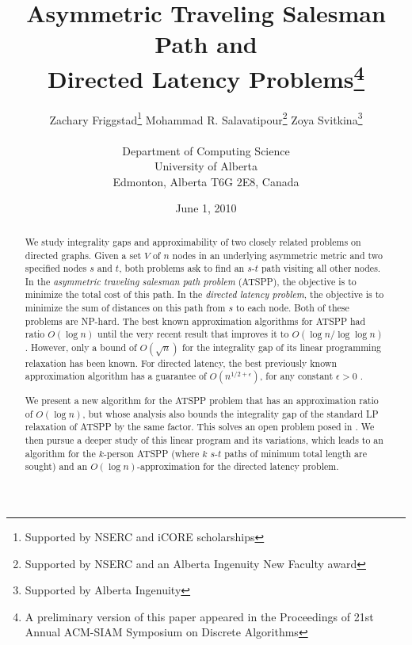 \documentclass[11pt]{article}
\begin{document}
\title{\Large Asymmetric Traveling Salesman Path and\\ Directed Latency Problems\footnote{A preliminary 
version of this paper appeared in the Proceedings of 21st Annual ACM-SIAM Symposium on 
Discrete Algorithms}}
\author{
Zachary Friggstad\thanks{Supported by NSERC and iCORE scholarships} \hspace{12mm}
Mohammad R. Salavatipour\thanks{Supported by NSERC and an Alberta Ingenuity New Faculty award} \hspace{12mm}
Zoya Svitkina\thanks{Supported by Alberta Ingenuity}\\
\\
\small{Department of Computing Science}\\ 
\small{University of Alberta}\\
\small{Edmonton, Alberta T6G 2E8, Canada}
}

\date{June 1, 2010}
\maketitle


\begin{abstract} 

We study integrality gaps and approximability of two closely related problems on directed graphs. 
Given a set $V$ of $n$ nodes in an underlying asymmetric metric and two
specified nodes $s$ and $t$, both problems ask to find an $s$-$t$ path visiting all other nodes. In 
the {\em asymmetric traveling salesman path problem} (ATSPP), the objective is to minimize the total cost of this path. In the {\em directed latency problem}, the objective is to minimize the sum of distances on this path from $s$ to each node.  Both of these problems are NP-hard. 
The best known approximation algorithms for ATSPP had 
ratio $O(\log n)$ \cite{chekuri:pal:atspp,feige:singh} until the very recent result that improves it to $O(\log n/\log \log n)$ \cite{asadpour:atsp,feige:singh}. However, only a bound of $O(\sqrt{n})$ for the integrality gap of its linear programming relaxation has been known. For directed latency, the best previously known approximation algorithm has a guarantee 
of $O(n^{1/2+\epsilon})$, for any constant $\epsilon>0$ \cite{nagarajan:ravi:latency}. 


We present a new algorithm for the ATSPP problem that has an approximation ratio of $O(\log n)$, 
but whose analysis also bounds the integrality gap of the standard LP relaxation of ATSPP by the same factor. This solves an open problem posed in \cite{chekuri:pal:atspp}.  We then pursue
a deeper study of this linear program and its variations, which leads to an algorithm for the $k$-person ATSPP (where $k$ $s$-$t$ paths of minimum total length are sought) and an $O(\log n)$-approximation for the directed latency problem.  


\end{abstract}
\end{document}
